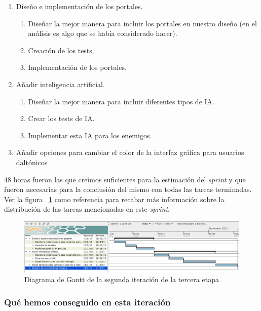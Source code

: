\begin{enumerate}[label=\bfseries WBS 2.\arabic*]
  \item Diseño e implementación de los portales.
    \begin{enumerate}[label=\bfseries WBS 2.1.\arabic*]
      \item Diseñar la mejor manera para incluir los portales en nuestro diseño (en el análisis es algo que se había considerado hacer).
      \item Creación de los tests.
      \item Implementación de los portales.
    \end{enumerate}
  \item Añadir inteligencia artificial.
  	\begin{enumerate}[label=\bfseries WBS 2.2.\arabic*]
      \item Diseñar la mejor manera para incluir diferentes tipos de IA.
      \item Crear los tests de IA.
      \item Implementar esta IA para los enemigos.
    \end{enumerate}
  \item Añadir opciones para cambiar el color de la interfaz gráfica para usuarios daltónicos
\end{enumerate}

48 horas fueron las que creímos suficientes para la estimación del \textit{sprint} y que fueron necesarias para la conclusión del mismo con todas las tareas terminadas. Ver la figura ~\ref{fig:sec3it2} como referencia para recabar más información sobre la distribución de las tareas mencionadas en este \textit{sprint}.

\begin{figure}
    \includegraphics[width=\textwidth,height=\textheight,keepaspectratio]{./img/sec3it2.png}
  \caption{Diagrama de Gantt de la segunda iteración de la tercera etapa}
  \label{fig:sec3it2}
\end{figure}

\subsubsection{Qué hemos conseguido en esta iteración}

